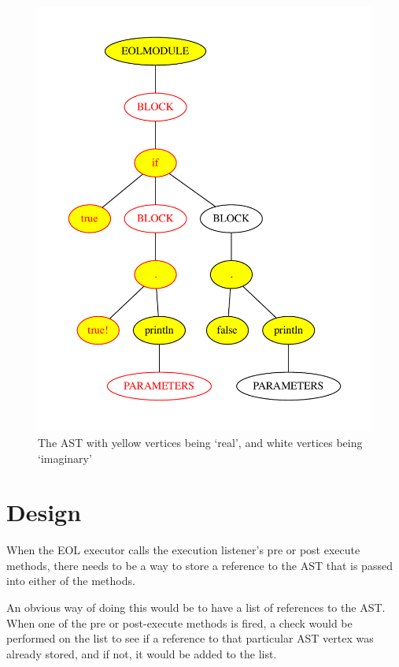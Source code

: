 \begin{figure}
	\centering
	\includegraphics[scale=0.5]{figures/ifElseRealAST.pdf}
	\caption{The AST with yellow vertices being `real', and white vertices being `imaginary'}
	\label{fig:ifElseASTreal}
\end{figure}

\section{Design}

When the EOL executor calls the execution listener's pre or post execute methods, there needs to be a way to store a reference to the AST that is passed into either of the methods.

An obvious way of doing this would be to have a list of references to the AST. When one of the pre or post-execute methods is fired, a check would be performed on the list to see if a reference to that particular AST vertex was already stored, and if not, it would be added to the list.

